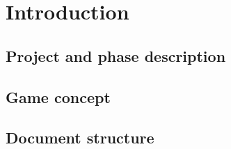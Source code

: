 \section{Introduction}
	
	\subsection{Project and phase description}
	
	\subsection{Game concept}
	
	\subsection{Document structure}